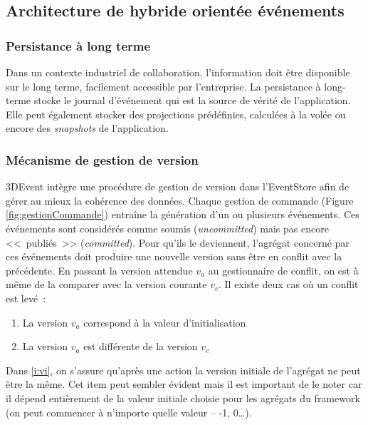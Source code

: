 \subsection{Architecture de hybride \og orientée événements\fg{}}
\label{sec:comm_event}



\subsubsection{Persistance à long terme}\label{sec:persistance-a-long-terme}
Dans un contexte industriel de collaboration, l'information doit être disponible sur le 
long terme, facilement accessible par l'entreprise. La persistance à 
long-terme stocke le journal d'événement qui est la 
source de vérité de l'application. Elle peut également stocker des projections 
prédéfinies, calculées à la volée ou encore des \textit{snapshots} de l'application.



\subsubsection{Mécanisme de gestion de version}
3DEvent intègre une procédure de gestion de version dans l'\gls{EventStore} afin 
de gérer au mieux la cohérence des données. 
Chaque gestion de commande (Figure \ref{fig:gestionCommande}) entraîne la 
génération d'un ou plusieurs événements. Ces événements sont considérés 
comme \og soumis\fg{} (\textit{uncommitted}) mais pas encore <<~publiés~>> 
(\textit{committed}).  Pour qu'ils le deviennent, l'agrégat concerné par ces 
événements doit produire une nouvelle version sans être en conflit avec la 
précédente. En passant la version attendue $v_a$ au gestionnaire de conflit, on 
est à même de la comparer avec la version courante $v_c$. Il existe deux cas où 
un conflit est levé~: 
\begin{enumerate}[label=\alph*)]
	\item \label{i:vi} La version $v_a$ correspond à la valeur d'initialisation
	\item \label{i:vdiff} La version $v_a$ est différente de la version $v_c$
\end{enumerate}
Dans \ref{i:vi}, on s'assure qu'après une action la version initiale de l'agrégat ne 
peut être la même. Cet item peut sembler évident mais il est important de le noter 
car il dépend entièrement de la valeur initiale choisie pour les agrégats du 
\gls{framework} (on peut commencer à n'importe quelle valeur -- -1, 0\ldots).



